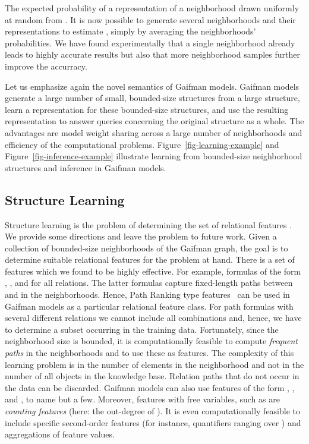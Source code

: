 \documentclass{article}
\begin{document}
The expected probability of a representation of a neighborhood drawn uniformly at random from . It is now possible to generate several neighborhoods  and their representations  to estimate , simply by averaging the neighborhoods' probabilities. We have found experimentally that a single neighborhood already leads to highly accurate results but also that more neighborhood samples further improve the accurracy. 

Let us emphasize again the novel semantics of Gaifman models. Gaifman models generate a large number of small, bounded-size structures from a large structure, learn a representation for these bounded-size structures, and use the resulting representation to answer queries concerning the original structure as a whole. The advantages are model weight sharing across a large number of neighborhoods and efficiency of the computational problems. Figure~\ref{fig-learning-example} and Figure~\ref{fig-inference-example} illustrate learning from bounded-size neighborhood structures and inference in Gaifman models. 







\subsection{Structure Learning}


Structure learning is the problem of determining the set of relational features . We provide some directions and leave the problem to future work. Given a collection of  bounded-size neighborhoods of the Gaifman graph, the goal is to determine suitable relational features for the problem at hand. There is a set of features which we found to be highly effective. For example, formulas of the form , , and  for all relations. The latter formulas capture fixed-length paths between  and  in the neighborhoods. Hence, Path Ranking type features~\cite{Lao:2011} can be used in Gaifman models as a particular relational feature class. For path formulas with several different relations we cannot include all  combinations and, hence, we have to determine a subset   occurring in the training data. Fortunately, since the neighborhood size is bounded, it is computationally feasible to compute \emph{frequent paths} in the neighborhoods and to use these as features. The complexity of this learning problem is in the number of elements in the neighborhood and not in the number of all objects in the knowledge base. Relation paths that do not occur in the data can be discarded. 
Gaifman models can also use features of the form , , and , to name but a few. Moreover, features with free variables, such as  are \emph{counting features} (here: the  out-degree of ). It is even computationally feasible to include specific second-order features (for instance, quantifiers ranging over ) and aggregations of feature values.
\end{document}
